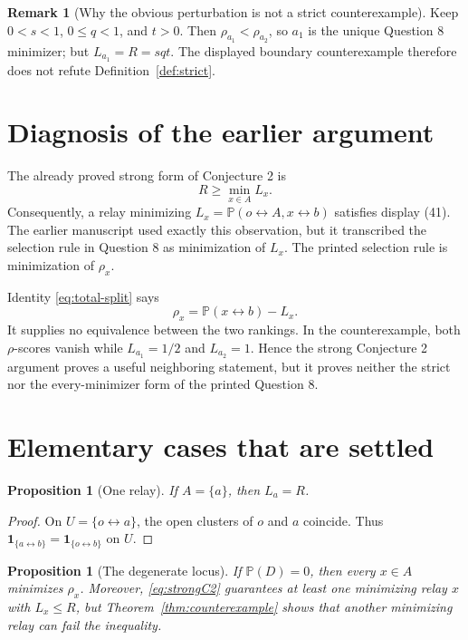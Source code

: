 \documentclass[11pt]{article}
\newtheorem{proposition}[theorem]{Proposition}
\theoremstyle{definition}
\newtheorem{remark}[theorem]{Remark}
\newcommand{\PP}{\mathbb P}
\newcommand{\con}{\leftrightarrow}
\newcommand{\1}{\mathbf 1}
\begin{document}
\begin{remark}[Why the obvious perturbation is not a strict counterexample]
Keep \(0<s<1\), \(0\le q<1\), and \(t>0\).  Then
\(\rho_{a_1}<\rho_{a_2}\), so \(a_1\) is the unique Question 8 minimizer;
but \(L_{a_1}=R=sqt\).  The displayed boundary counterexample therefore
does not refute Definition~\ref{def:strict}.
\end{remark}

\section{Diagnosis of the earlier argument}

The already proved strong form of Conjecture 2 is
\begin{equation}\label{eq:strongC2}
 R\ge \min_{x\in A}L_x.
\end{equation}
Consequently, a relay minimizing \(L_x=\PP(o\con A,x\con b)\) satisfies
display (41).  The earlier manuscript used exactly this observation, but
it transcribed the selection rule in Question 8 as minimization of \(L_x\).
The printed selection rule is minimization of \(\rho_x\).

Identity \eqref{eq:total-split} says
\[
 \rho_x=\PP(x\con b)-L_x.
\]
It supplies no equivalence between the two rankings.  In the
counterexample, both \(\rho\)-scores vanish while
\(L_{a_1}=1/2\) and \(L_{a_2}=1\).  Hence the strong Conjecture 2 argument
proves a useful neighboring statement, but it proves neither the strict
nor the every-minimizer form of the printed Question 8.

\section{Elementary cases that are settled}

\begin{proposition}[One relay]\label{prop:singleton}
If \(A=\{a\}\), then \(L_a=R\).
\end{proposition}

\begin{proof}
On \(U=\{o\con a\}\), the open clusters of \(o\) and \(a\) coincide.
Thus \(\1_{\{a\con b\}}=\1_{\{o\con b\}}\) on \(U\).
\end{proof}

\begin{proposition}[The degenerate locus]\label{prop:degenerate}
If \(\PP(D)=0\), then every \(x\in A\) minimizes \(\rho_x\).  Moreover,
\eqref{eq:strongC2} guarantees at least one minimizing relay \(x\) with
\(L_x\le R\), but Theorem~\ref{thm:counterexample} shows that another
minimizing relay can fail the inequality.
\end{proposition}
\end{document}
